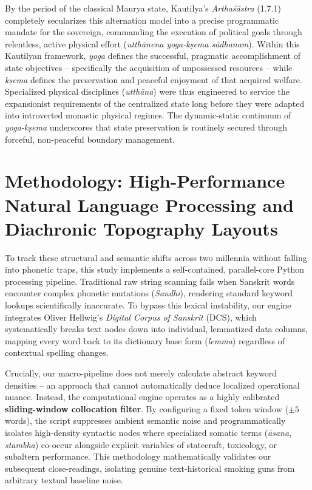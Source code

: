 \documentclass[11pt,twoside,letterpaper]{article}
\begin{document}
By the period of the classical Maurya state, Kautilya’s \textit{Arthaśāstra} (1.7.1) completely secularizes this alternation model into a precise programmatic mandate for the sovereign, commanding the execution of political goals through relentless, active physical effort (\textit{utthānena yoga-kṣema sādhanam}). Within this Kautilyan framework, \textit{yoga} defines the successful, pragmatic accomplishment of state objectives -- specifically the acquisition of unpossessed resources -- while \textit{kṣema} defines the preservation and peaceful enjoyment of that acquired welfare. Specialized physical disciplines (\textit{utthāna}) were thus engineered to service the expansionist requirements of the centralized state long before they were adapted into introverted monastic physical regimes. The dynamic-static continuum of \textit{yoga-kṣema} underscores that state preservation is routinely secured through forceful, non-peaceful boundary management.

\section{Methodology: High-Performance Natural Language Processing and Diachronic Topography Layouts}

To track these structural and semantic shifts across two millennia without falling into phonetic traps, this study implements a self-contained, parallel-core Python processing pipeline. Traditional raw string scanning fails when Sanskrit words encounter complex phonetic mutations (\textit{Sandhi}), rendering standard keyword lookups scientifically inaccurate. To bypass this lexical instability, our engine integrates Oliver Hellwig’s \textit{Digital Corpus of Sanskrit} (DCS), which systematically breaks text nodes down into individual, lemmatized data columns, mapping every word back to its dictionary base form (\textit{lemma}) regardless of contextual spelling changes.

Crucially, our macro-pipeline does not merely calculate abstract keyword densities -- an approach that cannot automatically deduce localized operational nuance. Instead, the computational engine operates as a highly calibrated \textbf{sliding-window collocation filter}. By configuring a fixed token window ($\pm 5$ words), the script suppresses ambient semantic noise and programmatically isolates high-density syntactic nodes where specialized somatic terms (\textit{āsana}, \textit{stambha}) co-occur alongside explicit variables of statecraft, toxicology, or subaltern performance. This methodology mathematically validates our subsequent close-readings, isolating genuine text-historical smoking guns from arbitrary textual baseline noise.
\end{document}
